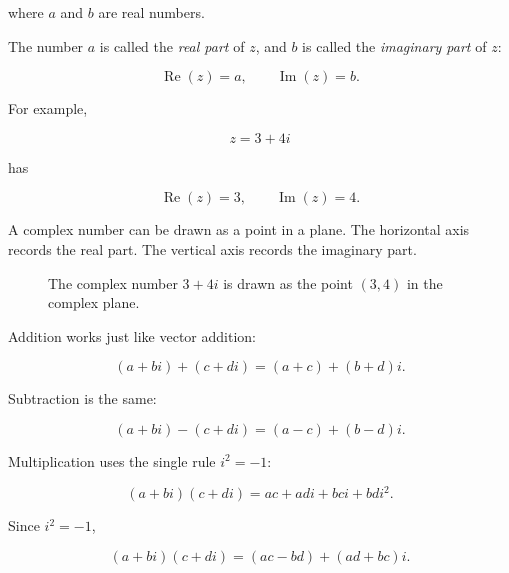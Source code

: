 where \(a\) and \(b\) are real numbers.

The number \(a\) is called the \emph{real part} of \(z\), and \(b\) is called the
\emph{imaginary part} of \(z\):

\[
\operatorname{Re}(z)=a,
\qquad
\operatorname{Im}(z)=b.
\]

For example,

\[
z=3+4i
\]

has

\[
\operatorname{Re}(z)=3,
\qquad
\operatorname{Im}(z)=4.
\]

A complex number can be drawn as a point in a plane.  The horizontal axis records the
real part.  The vertical axis records the imaginary part.

\begin{figure}[h]
\centering
{}
\caption{The complex number \(3+4i\) is drawn as the point \((3,4)\) in the complex plane.}
\label{fig:complex-plane-3-plus-4i}
\end{figure}

Addition works just like vector addition:

\[
(a+bi)+(c+di)=(a+c)+(b+d)i.
\]

Subtraction is the same:

\[
(a+bi)-(c+di)=(a-c)+(b-d)i.
\]

Multiplication uses the single rule \(i^2=-1\):

\[
(a+bi)(c+di)
=
ac+adi+bci+bdi^2.
\]

Since \(i^2=-1\),

\[
\boxed{
(a+bi)(c+di)=(ac-bd)+(ad+bc)i.
}
\]

